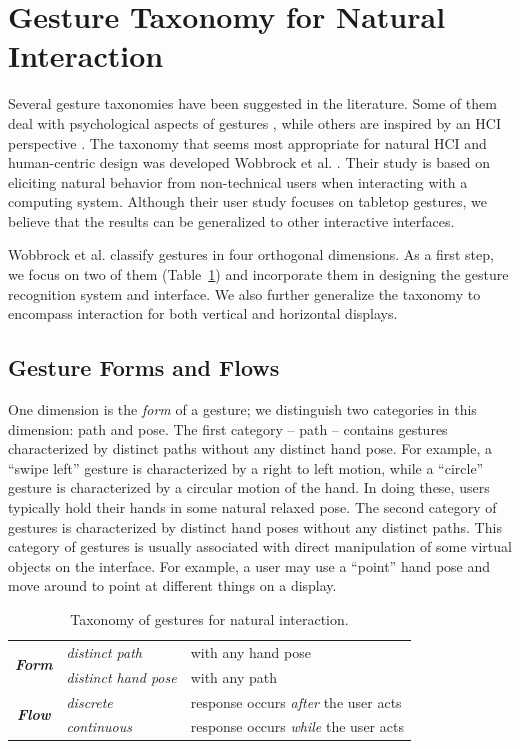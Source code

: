 \documentclass[conference]{IEEEtran}
\begin{document}
\section{Gesture Taxonomy for Natural Interaction}\label{sec:taxonomy}
Several gesture taxonomies have been suggested in the literature. Some of them
deal with psychological aspects of gestures \cite{kendon86, mcneill82}, while
others are inspired by an HCI perspective \cite{quek94,
quek95, Pavlovic97}. The taxonomy that seems most appropriate for natural HCI
and human-centric design was developed Wobbrock et al. \cite{wobbrock09}. Their
study is based on eliciting natural behavior from non-technical users when
interacting with a computing system. Although their user study focuses on
tabletop gestures, we believe that the results can be generalized to other
interactive interfaces. 

Wobbrock et al. classify gestures in four orthogonal dimensions. As a first
step, we focus on two of them (Table~\ref{tab:taxonomy}) and incorporate them in
designing the gesture recognition system and interface. We also further generalize the
taxonomy to encompass interaction for both vertical and horizontal displays.

\subsection{Gesture Forms and Flows}
One dimension is the \textit{form} of a gesture; we distinguish two
categories in this dimension: path and pose. The first category -- path --
contains gestures characterized by distinct paths without any distinct
hand pose. For example, a ``swipe left'' gesture is characterized by a
right to left motion, while a ``circle'' gesture is characterized by a
circular motion of the hand. In doing these, users typically hold their
hands in some natural relaxed pose. The second category of gestures is
characterized by distinct hand poses without any distinct paths. This category
of gestures is usually associated with direct manipulation of some virtual
objects on the interface.
For example, a user may use a ``point'' hand pose and move around to
point at different things on a display.

\begin{table}[t]
\caption{Taxonomy of gestures for natural interaction.}
\label{tab:taxonomy}
\centering
\begin{tabular}{|c|l|l|}
\hline
\multirow{2}{*}{\textbf{\textit{Form}}} & \textit{distinct path} & with any hand
pose
\\
\cline{2-3} 
                               & \textit{distinct hand pose} & with any path \\
\hline
\multirow{2}{*}{\textbf{\textit{Flow}}} & \textit{discrete} & response occurs
\textit{after} the user acts \\
\cline{2-3}
              & \textit{continuous} & response occurs \textit{while} the user
              acts \\
\hline
\end{tabular}
\end{table}
\end{document}

